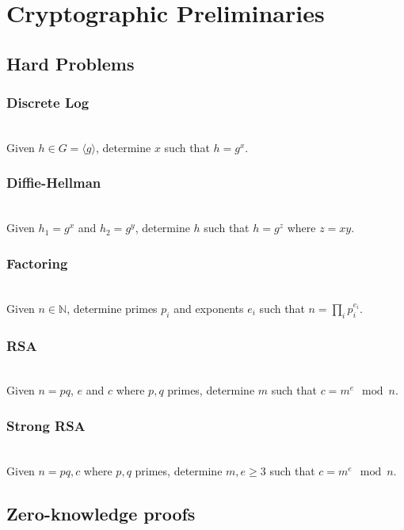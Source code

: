 \chapter{Cryptographic Preliminaries}

\section{Hard Problems}

\subsection{Discrete Log}~\\

Given $h \in G = \langle g \rangle$, determine $x$ such that $h = g^x$.

\subsection{Diffie-Hellman}~\\

Given $h_1 = g^x$ and $h_2 = g^y$, determine $h$ such that $h = g^z$ where $z = xy$.

\subsection{Factoring}~\\

Given $n \in \mathbb{N}$, determine primes $p_i$ and exponents $e_i$ such that $n = \prod_i p_i^{e_i}$.

\subsection{RSA}~\\

Given $n = pq$, $e$ and $c$ where $p, q$ primes, determine $m$ such that $c = m^e \mod n$.

\subsection{Strong RSA}~\\

Given $n = pq, c$ where $p, q$ primes, determine $m, e \geq 3$ such that $c = m^e \mod n$.


\section{Zero-knowledge proofs}

